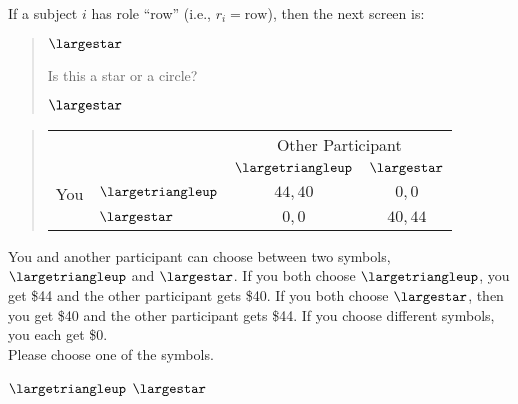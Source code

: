 \documentclass[11pt]{article}
\begin{document}
If a subject $i$ has role ``row'' (i.e., $r_i=\text{row}$), then the next screen is:
\begin{tcolorbox}
\begin{quote}
\begin{center}
{\Huge $\largestar$}
\end{center}
 \centering Is this a star or a circle?

 \begin{center}
$\largestar$ \qquad \textbigcircle
\end{center}
\end{quote}

\begin{quote}
\begin{center}
\begin{tabular}{llcc}
    & & \multicolumn{2}{c}{Other Participant}  \\
& & $\largetriangleup$ & $\largestar$  \\ \cline{3-4}
You & $\largetriangleup$ & \multicolumn{1}{|c|}{$44,40$} & \multicolumn{1}{c|}{$0,0$}  \\ \cline{3-4}
& $\largestar$ & \multicolumn{1}{|c|}{$0,0$} & \multicolumn{1}{c|}{$40,44$}  \\ \cline{3-4}
\end{tabular}
\end{center}
\end{quote}

You and another participant can choose between two symbols, $\largetriangleup$ and $\largestar$. If you both choose $\largetriangleup$, you get \$44 and the other participant gets \$40. If you both choose $\largestar$, then you get \$40 and the other participant gets \$44. If you choose different symbols, you each get \$0.\\


Please choose one of the symbols.\\

\begin{center}
$\largetriangleup$ \qquad $\largestar$
\end{center}
\end{tcolorbox}
\end{document}
